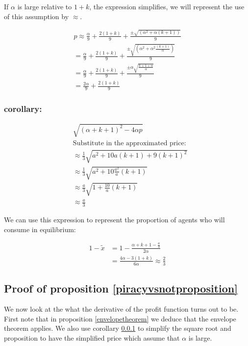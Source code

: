 \documentclass[12pt]{report}
\numberwithin{equation}{section}
\begin{document}
If $\alpha$ is large relative to $1+k$, the expression simplifies, we will represent the use of this assumption by $\approx$. 

\begin{align*}
p \approx \frac{\alpha}{9}+\frac{2(1+k)}{9}+\frac{ \pm \sqrt{(\alpha^2+\alpha (k+1))}}{9 } \\
=\frac{\alpha}{9}+\frac{2(1+k)}{9}+\frac{ \pm \sqrt{(\alpha^2+\alpha^2 \frac{(k+1)}{\alpha})}}{9 } \\
=\frac{\alpha}{9}+\frac{2(1+k)}{9}+\frac{ \pm \alpha \sqrt{ \frac{k+1+\alpha}{\alpha}}}{9} \\
=\frac{2\alpha}{9}+\frac{2(1+k)}{9}
\end{align*}


\subsubsection{corollary:}
\label{squareroot}

\begin{align*}
&\sqrt{(\alpha+k+1)^2-4 \alpha p} \\
&\text{Substitute in the approximated price:} \\
&\approx\frac{1}{3} \sqrt{a^2+10 a (k+1)+9 (k+1)^2} \\
&\approx \frac{1}{3} \sqrt{a^2+10  \frac{a^2}{a} (k+1)} \\
&\approx \frac{a}{3} \sqrt{1+ \frac{10}{a} (k+1)} \\
&\approx  \frac{a}{3}
\end{align*}

We can use this expression to represent the proportion of agents who will consume in equilibrium:

\begin{align}
1-\tilde{x} &= 1-\frac{\alpha+k+1-\frac{a}{3}}{2 \alpha} \\
&=\frac{4\alpha-3(1+k)}{6\alpha}
\approx \frac{2}{3}
\end{align}


\subsection{Proof of proposition \ref{piracyvsnotproposition}} \label{piracyvsnot}

We now look at the what the derivative of the profit function turns out to be. First note that in proposition \ref{envelopetheorem} we deduce that the envelope theorem applies. We also use corollary \ref{squareroot} to simplify the square root and proposition to have the simplified price which assume that $\alpha$ is large. 
\end{document}
